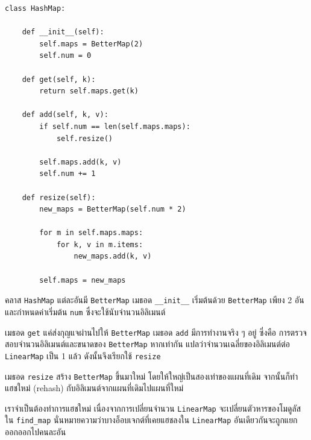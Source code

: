 \begin{verbatim}
class HashMap:

    def __init__(self):
        self.maps = BetterMap(2)
        self.num = 0

    def get(self, k):
        return self.maps.get(k)

    def add(self, k, v):
        if self.num == len(self.maps.maps):
            self.resize()

        self.maps.add(k, v)
        self.num += 1

    def resize(self):
        new_maps = BetterMap(self.num * 2)

        for m in self.maps.maps:
            for k, v in m.items:
                new_maps.add(k, v)

        self.maps = new_maps
\end{verbatim}

คลาส {\tt HashMap} แต่ละอันมี {\tt BetterMap} 
เมธอด \verb"__init__" เริ่มต้นด้วย {\tt BetterMap} เพียง 2 อัน
และกำหนดค่าเริ่มต้น {\tt num} ซึ่งจะใช้นับจำนวนอิลิเมนต์


เมธอด {\tt get} แค่ส่งกุญแจผ่านไปให้ {\tt BetterMap} 
เมธอด {\tt add} มีการทำงานจริง ๆ อยู่ ซึ่งคือ การตรวจสอบจำนวนอิลิเมนต์และขนาดของ {\tt BetterMap} 
หากเท่ากัน แปลว่าจำนวนเฉลี่ยของอิลิเมนต์ต่อ \texttt{LinearMap} เป็น 1 แล้ว ดังนั้นจึงเรียกใช้ {\tt resize}


เมธอด {\tt resize} สร้าง {\tt BetterMap} ขึ้นมาใหม่ โดยให้ใหญ่เป็นสองเท่าของแผนที่เดิม
จากนั้นก็ทำแฮชใหม่ (rehash) กับอิลิเมนต์จากแผนที่เดิมไปแผนที่ใหม่


เราจำเป็นต้องทำการแฮชใหม่ เนื่องจากการเปลี่ยนจำนวน \texttt{LinearMap} จะเปลี่ยนตัวหารของโมดูลัสใน \verb"find_map" 
นั่นหมายความว่าบางอ็อบเจกต์ที่เคยแฮชลงใน \texttt{LinearMap} อันเดียวกันจะถูกแยกออกออกไปคนละอัน

